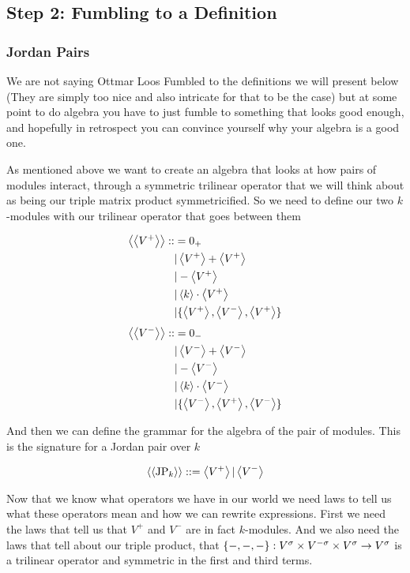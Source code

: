\subsection{Step 2: Fumbling to a Definition}
\subsubsection{Jordan Pairs}
We are not saying Ottmar Loos Fumbled to the definitions we will present below 
(They are simply too nice and also intricate for that to be the case) but at some point to do
algebra you have to just fumble to something that looks good enough, and hopefully in retrospect you can convince yourself
why your algebra is a good one.

As mentioned above we want to create an algebra that looks at how pairs of modules interact, through a symmetric 
trilinear operator that we will think about as being our triple matrix product symmetricified.
So we need to define our two $k$-modules with our trilinear operator that goes between them

\begin{align*}\left\langle \left\langle V^+ \right\rangle \right\rangle::&= 0_+ \\
                             &| \left\langle V^+ \right\rangle+\left\langle V^+ \right\rangle \\
                             &| -\left\langle V^+ \right\rangle \\
                             &| \left\langle k \right\rangle\cdot \left\langle V^+ \right\rangle\\ 
                             &| \{\left\langle V^+ \right\rangle, \left\langle V^- \right\rangle, \left\langle V^+ \right\rangle\}\end{align*}
\begin{align*}\left\langle \left\langle V^- \right\rangle \right\rangle::&= 0_- \\
    &| \left\langle V^- \right\rangle+\left\langle V^- \right\rangle \\
    &| -\left\langle V^- \right\rangle \\
    &| \left\langle k \right\rangle\cdot \left\langle V^- \right\rangle \\
    &| \{\left\langle V^- \right\rangle, \left\langle V^+ \right\rangle, \left\langle V^- \right\rangle\}\end{align*}
 
And then we can define the grammar for the algebra of the pair of modules. This is the signature for a Jordan pair over $k$

\[\left\langle \left\langle \text{JP}_k \right\rangle \right\rangle::= \left\langle V^+ \right\rangle | \left\langle V^- \right\rangle\]

Now that we know what operators we have in our world we need laws to tell us what these operators mean and how we can rewrite expressions.
First we need the laws that tell us that $V^+$ and $V^-$ are in fact $k$-modules.
And we also need the laws that tell about our triple product, that $\{-,-,-\}:V^\sigma\times V^{-\sigma}\times V^\sigma\rightarrow V^\sigma$ is a trilinear operator and symmetric in the first and third terms. 

